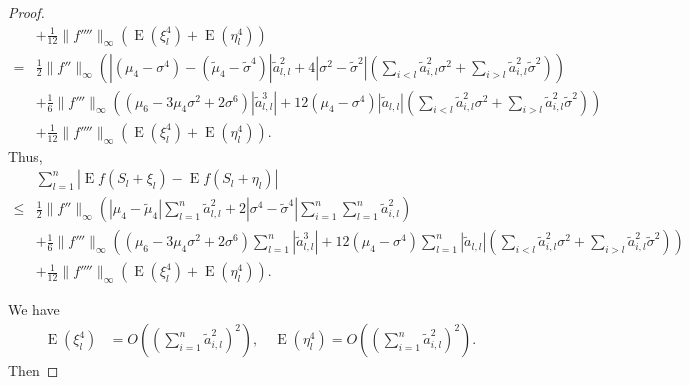 \documentclass[11pt]{article}
\DeclareMathOperator{\myE}{E}
\theoremstyle{plain}
\theoremstyle{definition}
\theoremstyle{remark}
\begin{document}
\begin{appendices}
\begin{proof}
\begin{equation*}
\begin{split}
            &+
            \frac{1}{12} \|f'''' \|_{\infty} \left(\myE (\xi_{l}^4)+\myE (\eta_{l}^4)\right)
            \\
=&\frac{1}{2}
\|f''\|_\infty
\left(
\left|
            (\mu_4-\sigma^4)
            -
            (\tilde \mu_4- \tilde \sigma^4)
\right|
        \tilde a_{l,l}^2
        +4|\sigma^2 - \tilde \sigma^2|
        \left( \sum_{i<l} \tilde a_{i,l}^2 \sigma^2 + \sum_{i>l} \tilde a_{i,l}^2 \tilde \sigma^2   \right)
        \right)
        \\
            &+
\frac{1}{6} \|f'''\|_\infty
\left(
        (\mu_6 - 3\mu_4 \sigma^2 + 2\sigma^6)
        |\tilde a_{l,l}^3 |
        +
        12 (\mu_4-\sigma^4)
        |\tilde a_{l,l}| \left( \sum_{i<l} \tilde a_{i,l}^2 \sigma^2 + \sum_{i>l} \tilde a_{i,l}^2 \tilde \sigma^2    \right)
    \right)
    \\
            &+
            \frac{1}{12} \|f'''' \|_{\infty} \left(\myE (\xi_{l}^4)+\myE (\eta_{l}^4)\right)
            .
        \end{split}
    \end{equation*}
    Thus,
    \begin{equation*}
        \begin{split}
             &
             \sum_{l=1}^n \left| \myE f(S_{l}+\xi_{l})-\myE f(S_{l}+\eta_{l})\right|
             \\
\leq&
\frac{1}{2}
\|f''\|_\infty
\left(
\left|
            \mu_4
            -
            \tilde \mu_4
\right|
\sum_{l=1}^n \tilde a_{l,l}^2
        +2|\sigma^4 - \tilde \sigma^4|
        \sum_{i=1}^n \sum_{l=1}^n \tilde a_{i,l}^2    \right)
        \\
            &+
            \frac{1}{6} \|f'''\|_{\infty}
\left(
        (\mu_6 - 3\mu_4 \sigma^2 + 2\sigma^6)
        \sum_{l=1}^n  |\tilde a_{l,l}^3 |
        +
        12 (\mu_4-\sigma^4)
        \sum_{l=1}^n |\tilde a_{l,l}| \left( \sum_{i<l} \tilde a_{i,l}^2 \sigma^2 + \sum_{i>l} \tilde a_{i,l}^2 \tilde \sigma^2    \right)
    \right)
    \\
            &+
            \frac{1}{12} \|f'''' \|_{\infty} \left(\myE (\xi_{l}^4)+\myE (\eta_{l}^4)\right)
            .
        \end{split}
    \end{equation*}

We have
\begin{equation*}
    \begin{split}
        \myE (\xi_l^4)&=
        O((\sum_{i=1}^n \tilde a_{i,l}^2 )^2)
        ,
        \quad
        \myE (\eta_l^4)=
O((\sum_{i=1}^n \tilde a_{i,l}^2 )^2)
.
    \end{split}
\end{equation*}
Then


\end{proof}
\end{appendices}
\end{document}
